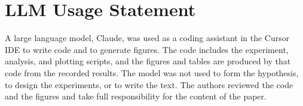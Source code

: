 \section*{LLM Usage Statement}
\label{sec:llm}

A large language model, Claude, was used as a coding assistant in the Cursor IDE to write code and to generate figures.
The code includes the experiment, analysis, and plotting scripts, and the figures and tables are produced by that code from the recorded results.
The model was not used to form the hypothesis, to design the experiments, or to write the text.
The authors reviewed the code and the figures and take full responsibility for the content of the paper.
